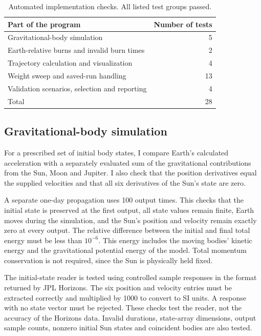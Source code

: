 \documentclass[11pt,letterpaper]{article}
\begin{document}
\begin{table}[htbp]
\centering
\caption{Automated implementation checks. All listed test groups passed.}
\label{tab:implementation_tests}
\begin{tabular}{lr}
\toprule
Part of the program & Number of tests\\
\midrule
Gravitational-body simulation & 5\\
Earth-relative burns and invalid burn times & 2\\
Trajectory calculation and visualization & 4\\
Weight sweep and saved-run handling & 13\\
Validation scenarios, selection and reporting & 4\\
\midrule
Total & 28\\
\bottomrule
\end{tabular}
\end{table}

\subsection{Gravitational-body simulation}
For a prescribed set of initial body states, I compare Earth's
calculated acceleration with a separately evaluated sum of the
gravitational contributions from the Sun, Moon and Jupiter. I also
check that the position derivatives equal the supplied velocities
and that all six derivatives of the Sun's state are zero.

A separate one-day propagation uses 100 output times. This checks
that the initial state is preserved at the first output, all state
values remain finite, Earth moves during the simulation, and the
Sun's position and velocity remain exactly zero at every output.
The relative difference between the initial and final total energy
must be less than $10^{-6}$. This energy includes the moving bodies'
kinetic energy and the gravitational potential energy of the model.
Total momentum conservation is not required, since the Sun is
physically held fixed.

The initial-state reader is tested using controlled sample responses
in the format returned by JPL Horizons. The six position and velocity
entries must be extracted correctly and multiplied by 1000 to convert
to SI units. A response with no state vector must be rejected. These
checks test the reader, not the accuracy of the Horizons data.
Invalid durations, state-array dimensions, output sample counts,
nonzero initial Sun states and coincident bodies are also tested.
\end{document}
